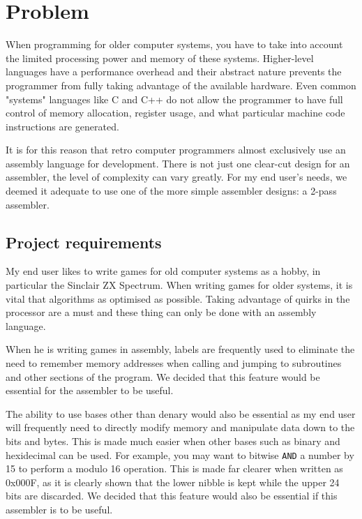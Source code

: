 \documentclass[a4paper]{report}
\begin{document}
\section{Problem}

When programming for older computer systems, you have to take into account the
limited processing power and memory of these systems. Higher-level languages
have a performance overhead and their abstract nature prevents the programmer
from fully taking advantage of the available hardware. Even common "systems"
languages like C and C++ do not allow the programmer to have full control of
memory allocation, register usage, and what particular machine code instructions
are generated.

It is for this reason that retro computer programmers almost exclusively use an
assembly language for development. There is not just one clear-cut design for an
assembler, the level of complexity can vary greatly. For my end user's needs, we
deemed it adequate to use one of the more simple assembler designs: a 2-pass
assembler.

\subsection{Project requirements}

My end user likes to write games for old computer systems as a hobby, in
particular the Sinclair ZX Spectrum. When writing games for older systems, it is
vital that algorithms as optimised as possible. Taking advantage of quirks in
the processor are a must and these thing can only be done with an assembly
language.

When he is writing games in assembly, labels are frequently used to eliminate
the need to remember memory addresses when calling and jumping to subroutines
and other sections of the program. We decided that this feature would be
essential for the assembler to be useful.

The ability to use bases other than denary would also be essential as my end
user will frequently need to directly modify memory and manipulate data down to
the bits and bytes. This is made much easier when other bases such as binary and
hexidecimal can be used. For example, you may want to bitwise
\texttt{AND} a number by 15 to perform a modulo 16 operation. This is made far
clearer when written as 0x000F, as it is clearly shown that the lower nibble is
kept while the upper 24 bits are discarded. We decided that this feature would
also be essential if this assembler is to be useful.
\end{document}
